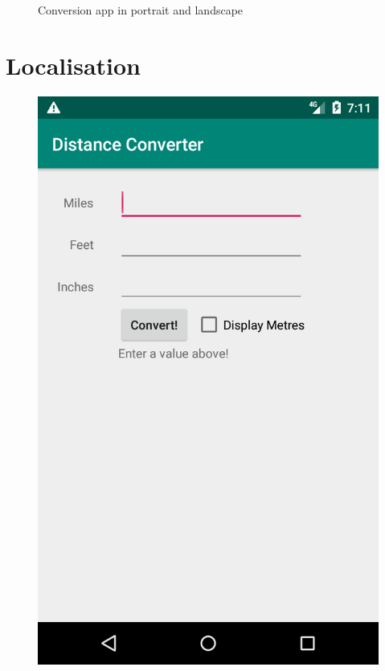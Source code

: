 \documentclass{scrartcl}
\begin{document}
\begin{figure}[h]
    \caption{Conversion app in portrait and landscape}
\end{figure}

\pagebreak

\section*{Localisation}

\begin{figure}[h]
    \centering
    \includegraphics[scale=0.2]{images/english.png}

\end{figure}
\end{document}
